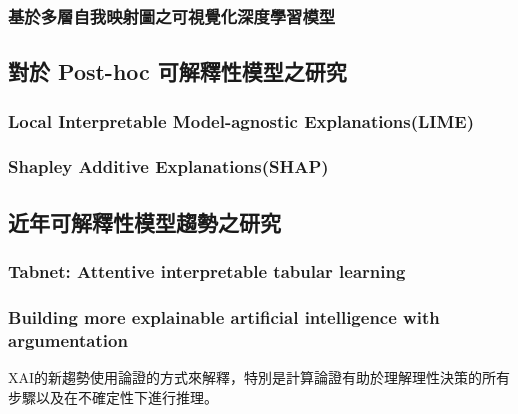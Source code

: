 \documentclass[class=NCU_thesis, crop=false]{standalone}
\begin{document}
\subsubsection{基於多層自我映射圖之可視覺化深度學習模型}

\subsection{對於 Post-hoc 可解釋性模型之研究}
\subsubsection{Local Interpretable Model-agnostic Explanations(LIME)} 
\subsubsection{Shapley Additive Explanations(SHAP)}

\subsection{近年可解釋性模型趨勢之研究}
\subsubsection{Tabnet: Attentive interpretable tabular learning}
\subsubsection{Building more explainable artificial intelligence with argumentation}
XAI的新趨勢使用論證的方式來解釋，特別是計算論證有助於理解理性決策的所有步驟以及在不確定性下進行推理。 \cite{LONGO2024102301}
\end{document}
